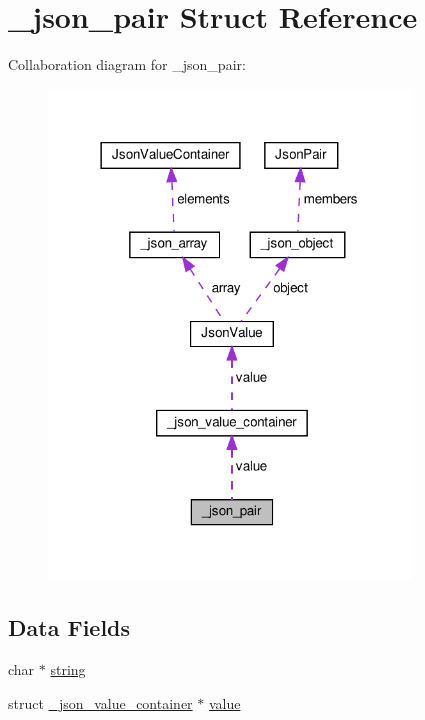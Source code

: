\hypertarget{struct__json__pair}{}\section{\+\_\+json\+\_\+pair Struct Reference}
\label{struct__json__pair}


Collaboration diagram for \+\_\+json\+\_\+pair\+:\nopagebreak
\begin{figure}[H]
\begin{center}
\leavevmode
\includegraphics[width=273pt]{struct__json__pair__coll__graph}
\end{center}
\end{figure}
\subsection*{Data Fields}
\begin{DoxyCompactItemize}
\item 
char $\ast$ \hyperlink{struct__json__pair_ad599f0ce62f57e7465046444953b6275}{string}
\item 
struct \hyperlink{struct__json__value__container}{\+\_\+json\+\_\+value\+\_\+container} $\ast$ \hyperlink{struct__json__pair_a70e763b09977d01bdc56afc59fd44989}{value}
\end{DoxyCompactItemize}


